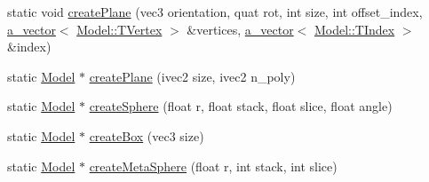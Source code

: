 \begin{DoxyCompactItemize}
\item 
static void \hyperlink{class_agmd_1_1_geometry_factory_a0ee14406d444d8146c3d6b8beb21b5ea}{create\+Plane} (vec3 orientation, quat rot, int size, int offset\+\_\+index, \hyperlink{_vector_8h_a3df82cea60ff4ad0acb44e58454406a5}{a\+\_\+vector}$<$ \hyperlink{struct_agmd_1_1_model_1_1_t_vertex}{Model\+::\+T\+Vertex} $>$ \&vertices, \hyperlink{_vector_8h_a3df82cea60ff4ad0acb44e58454406a5}{a\+\_\+vector}$<$ \hyperlink{class_agmd_1_1_model_aca4a6ee5402b386a0b9d0aea52c71eaa}{Model\+::\+T\+Index} $>$ \&index)
\item 
static \hyperlink{class_agmd_1_1_model}{Model} $\ast$ \hyperlink{class_agmd_1_1_geometry_factory_af5368cbf2b2bbec18d2bc56d854fef2f}{create\+Plane} (ivec2 size, ivec2 n\+\_\+poly)
\item 
static \hyperlink{class_agmd_1_1_model}{Model} $\ast$ \hyperlink{class_agmd_1_1_geometry_factory_aead440e856248f59b15e3cb42d35e8d9}{create\+Sphere} (float r, float stack, float slice, float angle)
\item 
static \hyperlink{class_agmd_1_1_model}{Model} $\ast$ \hyperlink{class_agmd_1_1_geometry_factory_a5a582390629f99ebd202503073ef7b1c}{create\+Box} (vec3 size)
\item 
static \hyperlink{class_agmd_1_1_model}{Model} $\ast$ \hyperlink{class_agmd_1_1_geometry_factory_a50e128bc520f3d2c7e0c1d858f1c3ad6}{create\+Meta\+Sphere} (float r, int stack, int slice)
\end{DoxyCompactItemize}


